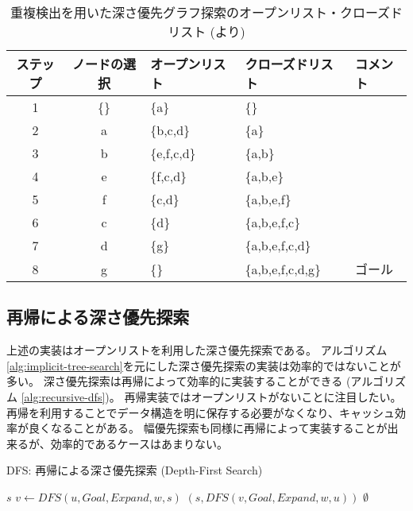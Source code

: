 \begin{table}[tbh]
\centering
\caption{重複検出を用いた深さ優先グラフ探索のオープンリスト・クローズドリスト (\cite{edelkamp:2010:hst:1875144}より)}
\begin{tabular}{c|c|l|l|l}
  \toprule
	ステップ & ノードの選択 & オープンリスト   & クローズドリスト & コメント \\ \midrule
	1 	  & \{\}     & \{a\}       & \{\} \\
	2     & a        & \{b,c,d\}   & \{a\} \\
	3     & b        & \{e,f,c,d\} & \{a,b\} \\
	4     & e        & \{f,c,d\}   & \{a,b,e\} \\
	5     & f        & \{c,d\}     & \{a,b,e,f\} \\
	6     & c        & \{d\}       & \{a,b,e,f,c\} \\
	7     & d        & \{g\}       & \{a,b,e,f,c,d\} \\
	8     & g        & \{\}        & \{a,b,e,f,c,d,g\} & ゴール \\
        \bottomrule
\end{tabular}
\label{tbl:dfs-traj}
\end{table}

\subsection{再帰による深さ優先探索}
\label{sec:recursive-depth-first-search}

上述の実装はオープンリストを利用した深さ優先探索である。
アルゴリズム \ref{alg:implicit-tree-search}を元にした深さ優先探索の実装は効率的ではないことが多い。
深さ優先探索は再帰によって効率的に実装することができる (アルゴリズム \ref{alg:recursive-dfs})。
再帰実装ではオープンリストがないことに注目したい。
再帰を利用することでデータ構造を明に保存する必要がなくなり、キャッシュ効率が良くなることがある。
幅優先探索も同様に再帰によって実装することが出来るが、効率的であるケースはあまりない。

\begin{algorithm}[tbh]
\caption{DFS: 再帰による深さ優先探索 (Depth-First Search)}
\label{alg:recursive-dfs}
	 {
		\Return $s$\;
	}
	 {
          $v \leftarrow DFS(u, Goal, Expand, w, s)$\;
	   {
	    \Return $(s, DFS(v, Goal, Expand, w, u))$
	  }
	}
	\Return $\emptyset$\;
\end{algorithm}


